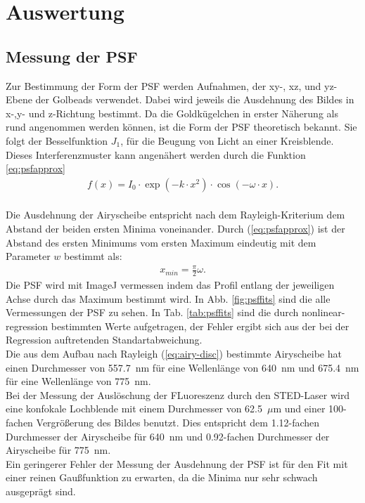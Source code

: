 \section{Auswertung}
\subsection{Messung der PSF}
Zur Bestimmung der Form der PSF werden Aufnahmen, der xy-, xz, und yz-Ebene der Golbeads verwendet. 
Dabei wird jeweils die Ausdehnung des Bildes in x-,y- und z-Richtung bestimmt.
Da die Goldkügelchen in erster Näherung als rund angenommen werden können, ist die Form der PSF theoretisch bekannt.
Sie folgt der Besselfunktion $J_1$, für die Beugung von Licht an einer Kreisblende.
Dieses Interferenzmuster kann angenähert werden durch die Funktion \ref{eq:psfapprox}
\begin{align}
	f(x)=I_0 \cdot \exp \left( -k \cdot x^2 \right) \cdot \cos \left(-\omega\cdot x\right). \label{eq:psfapprox}
\end{align}
\\ 
Die Ausdehnung der Airyscheibe entspricht nach dem Rayleigh-Kriterium dem Abstand der beiden ersten Minima voneinander. 
Durch (\ref{eq:psfapprox}) ist der Abstand des ersten Minimums vom ersten Maximum eindeutig mit dem Parameter $w$ bestimmt als:
\begin{align}
x_{min} = \frac{\pi}{2}\omega.
\end{align}
Die PSF wird mit ImageJ vermessen indem das Profil entlang der jeweiligen Achse durch das Maximum bestimmt wird.
In Abb. \ref{fig:psffits} sind die alle Vermessungen der PSF zu sehen. In Tab. \ref{tab:psffits} sind die durch nonlinear-regression bestimmten Werte aufgetragen, der Fehler ergibt sich aus der bei der Regression auftretenden Standartabweichung.
\\
Die aus dem Aufbau nach Rayleigh (\ref{eq:airy-disc}) bestimmte Airyscheibe hat einen Durchmesser von 557.7~nm für eine Wellenlänge von 640~nm und 675.4~nm für eine Wellenlänge von 775~nm.
\\
Bei der Messung der Auslöschung der FLuoreszenz durch den STED-Laser wird eine konfokale Lochblende mit einem Durchmesser von 62.5~$\mu$m und einer 100-fachen Vergrößerung des Bildes benutzt. 
Dies entspricht dem 1.12-fachen Durchmesser der Airyscheibe für 640~nm und 0.92-fachen Durchmesser der Airyscheibe für 775~nm.
\\ 
Ein geringerer Fehler der Messung der Ausdehnung der PSF ist für den Fit mit einer reinen Gaußfunktion zu erwarten, da die Minima nur sehr schwach ausgeprägt sind. 
